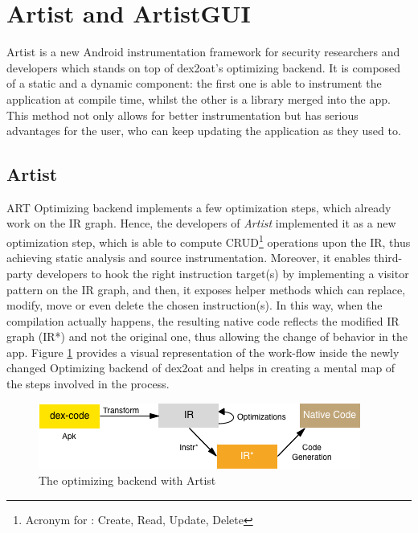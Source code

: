 \section{Artist and ArtistGUI}
Artist is a new Android instrumentation framework for security researchers and developers which stands on top of dex2oat's optimizing backend. It is composed of a static and a dynamic component: the first one is able to instrument the application at compile time, whilst the other is a library merged into the app. This method not only allows for better instrumentation but has serious advantages for the user, who can keep updating the application as they used to.

\subsection{Artist}
\label{sec:artist}
ART Optimizing backend implements a few optimization steps, which already work on the IR graph. Hence, the developers of \emph{Artist} implemented it as a new optimization step, which is able to compute CRUD\footnote{Acronym for : Create, Read, Update, Delete} operations upon the IR, thus achieving static analysis and source instrumentation. Moreover, it enables third-party developers to hook the right instruction target(s) by implementing a visitor pattern on the IR graph, and then, it exposes helper methods which can replace, modify, move or even delete the chosen instruction(s). In this way, when the compilation actually happens, the resulting native code reflects the modified IR graph (IR*) and not the original one, thus allowing the change of behavior in the app. Figure \ref{fig:optbackend} provides a visual representation of the work-flow inside the newly changed Optimizing backend of dex2oat and helps in creating a mental map of the steps involved in the process.

\begin{figure}[H]
	\centering
	\includegraphics{img/dex2oat.png}
	\caption{The optimizing backend with Artist}
	\label{fig:optbackend}
\end{figure}

